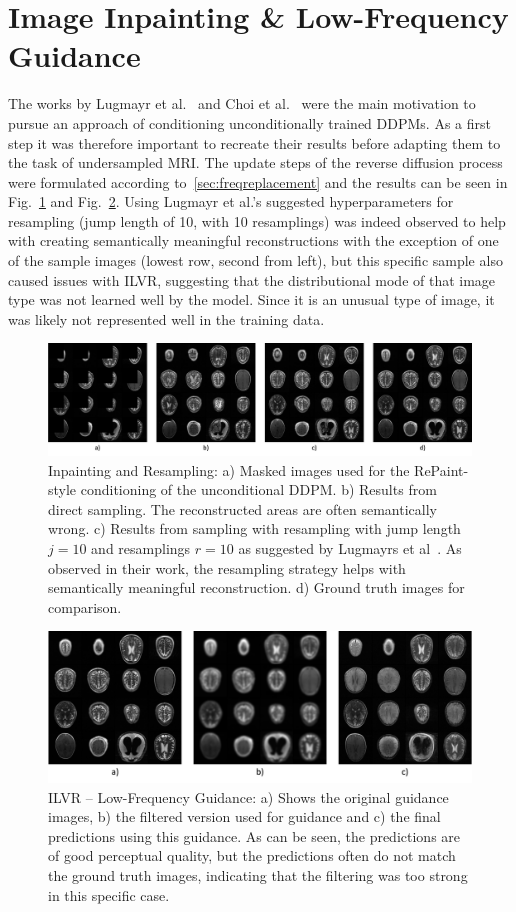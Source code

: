 \section{Image Inpainting \& Low-Frequency Guidance}
The works by Lugmayr et al.~\autocite{lugmayr2022repaint} and Choi et al.~\autocite{choi2021ilvr} were the main motivation to pursue an approach of conditioning unconditionally trained DDPMs. As a first step it was therefore important to recreate their results before adapting them to the task of undersampled MRI. The update steps of the reverse diffusion process were formulated according to~\ref{sec:freqreplacement} and the results can be seen in Fig.~\ref{fig:repaint} and Fig.~\ref{fig:ilvr}. Using Lugmayr et al.'s suggested hyperparameters for resampling (jump length of 10, with 10 resamplings) was indeed observed to help with creating semantically meaningful reconstructions with the exception of one of the sample images (lowest row, second from left), but this specific sample also caused issues with ILVR, suggesting that the distributional mode of that image type was not learned well by the model. Since it is an unusual type of image, it was likely not represented well in the training data.
\begin{figure}[h]
    \centering
    \includegraphics[width=.8\textwidth]{images/repaint.png}
    \caption[Inpainting and Resampling]{Inpainting and Resampling: a) Masked images used for the RePaint-style conditioning of the unconditional DDPM. b) Results from direct sampling. The reconstructed areas are often semantically wrong. c) Results from sampling with resampling with jump length $j=10$ and resamplings $r=10$ as suggested by Lugmayrs et al~\autocite{lugmayr2022repaint}. As observed in their work, the resampling strategy helps with semantically meaningful reconstruction. d) Ground truth images for comparison.}
    \label{fig:repaint}
\end{figure}

\begin{figure}[h]
    \centering
    \includegraphics[width=.6\textwidth]{images/ilvr.png}
    \caption[ILVR -- Low-Frequency Guidance]{ILVR -- Low-Frequency Guidance: a) Shows the original guidance images, b) the filtered version used for guidance and c) the final predictions using this guidance. As can be seen, the predictions are of good perceptual quality, but the predictions often do not match the ground truth images, indicating that the filtering was too strong in this specific case.}
    \label{fig:ilvr}
\end{figure}

